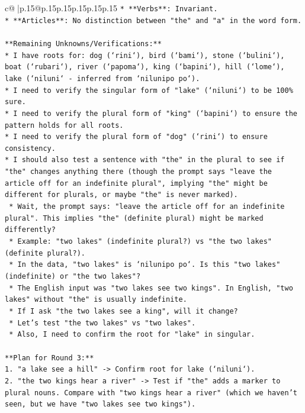 \documentclass{article}
\begin{document}
{\begin{supertabular}{c@{$\;$}|p{.15\linewidth}@{}p{.15\linewidth}p{.15\linewidth}p{.15\linewidth}p{.15\linewidth}p{.15\linewidth}}
{{{\texttt{*   **Verbs**: Invariant.} \\
\texttt{*   **Articles**: No distinction between "the" and "a" in the word form.} \\
\\ 
\texttt{**Remaining Unknowns/Verifications:**} \\
\texttt{*   I have roots for: dog (`rini`), bird (`bami`), stone (`bulini`), boat (`rubari`), river (`papoma`), king (`bapini`), hill (`lome`), lake (`niluni` {-} inferred from `nilunipo po`).} \\
\texttt{*   I need to verify the singular form of "lake" (`niluni`) to be 100\% sure.} \\
\texttt{*   I need to verify the plural form of "king" (`bapini`) to ensure the pattern holds for all roots.} \\
\texttt{*   I need to verify the plural form of "dog" (`rini`) to ensure consistency.} \\
\texttt{*   I should also test a sentence with "the" in the plural to see if "the" changes anything there (though the prompt says "leave the article off for an indefinite plural", implying "the" might be different for plurals, or maybe "the" is never marked).} \\
\texttt{    *   Wait, the prompt says: "leave the article off for an indefinite plural". This implies "the" (definite plural) might be marked differently?} \\
\texttt{    *   Example: "two lakes" (indefinite plural?) vs "the two lakes" (definite plural?).} \\
\texttt{    *   In the data, "two lakes" is `nilunipo po`. Is this "two lakes" (indefinite) or "the two lakes"?} \\
\texttt{    *   The English input was "two lakes see two kings". In English, "two lakes" without "the" is usually indefinite.} \\
\texttt{    *   If I ask "the two lakes see a king", will it change?} \\
\texttt{    *   Let's test "the two lakes" vs "two lakes".} \\
\texttt{    *   Also, I need to confirm the root for "lake" in singular.} \\
\\ 
\texttt{**Plan for Round 3:**} \\
\texttt{1.  "a lake see a hill" {-}> Confirm root for lake (`niluni`).} \\
\texttt{2.  "the two kings hear a river" {-}> Test if "the" adds a marker to plural nouns. Compare with "two kings hear a river" (which we haven't seen, but we have "two lakes see two kings").} \\
}}}
\end{supertabular}}
\end{document}
